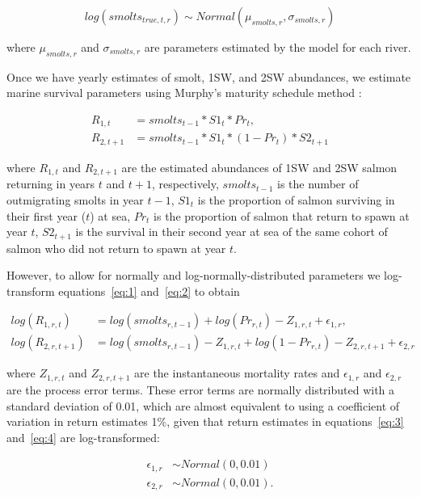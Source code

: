 \documentclass[12pt]{article}
\begin{document}
\begin{equation}
log(smolts_{true,t,r}) \sim Normal(\mu_{smolts,r}, \sigma_{smolts,r})
\end{equation}

where $\mu_{smolts,r}$ and $\sigma_{smolts,r}$ are parameters estimated by the
model for each river.

Once we have yearly estimates of smolt, 1SW, and 2SW abundances, we estimate
marine survival parameters using Murphy's maturity schedule method
\citep{Murphy1952, Ricker1975}:

\begin{align}
    R_{1,t} &= smolts_{t-1} * S1_t * Pr_t \label{eq:1}, \\
    R_{2,t+1} &= smolts_{t-1} * S1_t * (1 - Pr_t) * S2_{t+1} \label{eq:2}
\end{align}

where $R_{1,t}$ and $R_{2,t+1}$ are the estimated abundances of 1SW and 2SW
salmon returning in years $t$ and $t+1$, respectively, $smolts_{t-1}$ is the
number of outmigrating smolts in year $t-1$, $S1_t$ is the proportion of
salmon surviving in their first year ($t$) at sea, $Pr_t$ is the proportion of
salmon that return to spawn at year $t$, $S2_{t+1}$ is the survival in their
second year at sea of the same cohort of salmon who did not return to spawn at
year $t$.

However, to allow for normally and log-normally-distributed parameters we
log-transform equations~\ref{eq:1} and~\ref{eq:2} to obtain

\begin{align}
    log(R_{1,r,t}) &= log(smolts_{r,t-1}) + log(Pr_{r,t}) - Z_{1,r,t} + \epsilon_{1,r} \label{eq:3}, \\
    log(R_{2,r,t+1}) &= log(smolts_{r,t-1}) - Z_{1,r,t} + log(1 - Pr_{r,t})  - Z_{2,r,t+1} + \epsilon_{2,r} \label{eq:4} 
\end{align}

where $Z_{1,r,t}$ and $Z_{2,r,t+1}$ are the instantaneous mortality rates and $\epsilon_{1,r}$ and $\epsilon_{2,r}$
are the process error terms. 
These error terms are normally distributed with a standard deviation
of 0.01, which are almost equivalent to using a coefficient of variation in
return estimates 1\%, given that return estimates in equations~\ref{eq:3}
and~\ref{eq:4} are log-transformed:

\begin{align}
\epsilon_{1,r} &\sim Normal(0, 0.01) \\
\epsilon_{2,r} &\sim Normal(0, 0.01).
\end{align}
\end{document}
